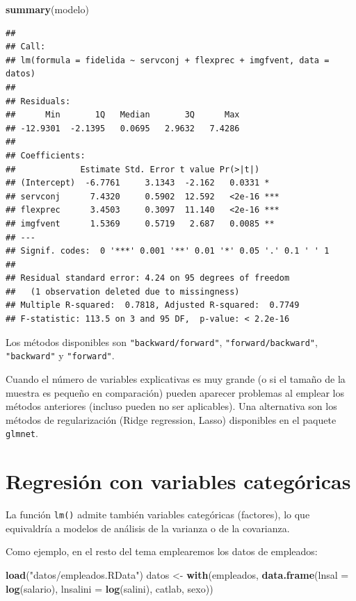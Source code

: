 \documentclass[]{book}
\newenvironment{Shaded}{\begin{snugshade}}{\end{snugshade}}
\newcommand{\KeywordTok}[1]{\textcolor[rgb]{0.13,0.29,0.53}{\textbf{#1}}}
\newcommand{\DataTypeTok}[1]{\textcolor[rgb]{0.13,0.29,0.53}{#1}}
\newcommand{\StringTok}[1]{\textcolor[rgb]{0.31,0.60,0.02}{#1}}
\newcommand{\NormalTok}[1]{#1}
\begin{document}
\begin{Shaded}
\begin{Highlighting}[]
\KeywordTok{summary}\NormalTok{(modelo)}
\end{Highlighting}
\end{Shaded}

\begin{verbatim}
## 
## Call:
## lm(formula = fidelida ~ servconj + flexprec + imgfvent, data = datos)
## 
## Residuals:
##      Min       1Q   Median       3Q      Max 
## -12.9301  -2.1395   0.0695   2.9632   7.4286 
## 
## Coefficients:
##             Estimate Std. Error t value Pr(>|t|)    
## (Intercept)  -6.7761     3.1343  -2.162   0.0331 *  
## servconj      7.4320     0.5902  12.592   <2e-16 ***
## flexprec      3.4503     0.3097  11.140   <2e-16 ***
## imgfvent      1.5369     0.5719   2.687   0.0085 ** 
## ---
## Signif. codes:  0 '***' 0.001 '**' 0.01 '*' 0.05 '.' 0.1 ' ' 1
## 
## Residual standard error: 4.24 on 95 degrees of freedom
##   (1 observation deleted due to missingness)
## Multiple R-squared:  0.7818, Adjusted R-squared:  0.7749 
## F-statistic: 113.5 on 3 and 95 DF,  p-value: < 2.2e-16
\end{verbatim}

Los métodos disponibles son \texttt{"backward/forward"},
\texttt{"forward/backward"}, \texttt{"backward"} y \texttt{"forward"}.

Cuando el número de variables explicativas es muy grande (o si el tamaño
de la muestra es pequeño en comparación) pueden aparecer problemas al
emplear los métodos anteriores (incluso pueden no ser aplicables). Una
alternativa son los métodos de regularización (Ridge regression, Lasso)
disponibles en el paquete \texttt{glmnet}.

\section{Regresión con variables
categóricas}\label{regresion-con-variables-categoricas}

La función \texttt{lm()} admite también variables categóricas
(factores), lo que equivaldría a modelos de análisis de la varianza o de
la covarianza.

Como ejemplo, en el resto del tema emplearemos los datos de empleados:

\begin{Shaded}
\begin{Highlighting}[]
\KeywordTok{load}\NormalTok{(}\StringTok{"datos/empleados.RData"}\NormalTok{)}
\NormalTok{datos <-}\StringTok{ }\KeywordTok{with}\NormalTok{(empleados, }\KeywordTok{data.frame}\NormalTok{(}\DataTypeTok{lnsal =} \KeywordTok{log}\NormalTok{(salario), }\DataTypeTok{lnsalini =} \KeywordTok{log}\NormalTok{(salini), catlab, sexo))}
\end{Highlighting}
\end{Shaded}
\end{document}

